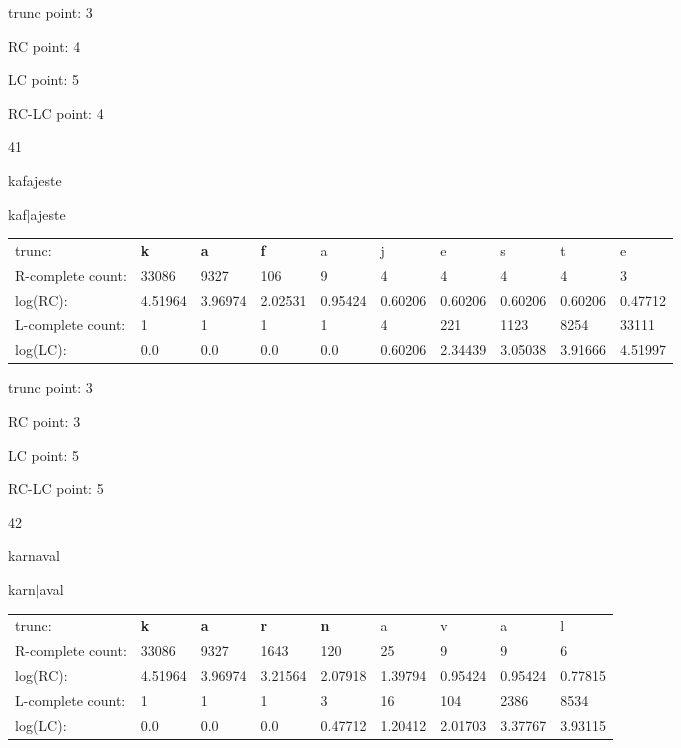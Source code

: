 \documentclass{article}
\begin{document}
trunc point: 3

RC point: 4

LC point: 5

RC-LC point: 4

\vspace{3em}



41

kafajeste

kaf$|$ajeste

\vspace{1em}

\begin{tabular}{l|lllllllll}

trunc: & {\color{red}\bf k} & {\color{red}\bf a} & {\color{red}\bf f} & a & j & e & s & t & e \\ 
R-complete count: & 33086 & 9327 & 106 & 9 & 4 & 4 & 4 & 4 & 3 \\ 
log(RC): & 4.51964 & 3.96974 & 2.02531 & 0.95424 & 0.60206 & 0.60206 & 0.60206 & 0.60206 & 0.47712 \\ 
L-complete count: & 1 & 1 & 1 & 1 & 4 & 221 & 1123 & 8254 & 33111 \\ 
log(LC): & 0.0 & 0.0 & 0.0 & 0.0 & 0.60206 & 2.34439 & 3.05038 & 3.91666 & 4.51997 \\ 
\end{tabular}

trunc point: 3

RC point: 3

LC point: 5

RC-LC point: 5

\vspace{3em}



42

karnaval

karn$|$aval

\vspace{1em}

\begin{tabular}{l|llllllll}

trunc: & {\color{red}\bf k} & {\color{red}\bf a} & {\color{red}\bf r} & {\color{red}\bf n} & a & v & a & l \\ 
R-complete count: & 33086 & 9327 & 1643 & 120 & 25 & 9 & 9 & 6 \\ 
log(RC): & 4.51964 & 3.96974 & 3.21564 & 2.07918 & 1.39794 & 0.95424 & 0.95424 & 0.77815 \\ 
L-complete count: & 1 & 1 & 1 & 3 & 16 & 104 & 2386 & 8534 \\ 
log(LC): & 0.0 & 0.0 & 0.0 & 0.47712 & 1.20412 & 2.01703 & 3.37767 & 3.93115 \\ 
\end{tabular}
\end{document}
